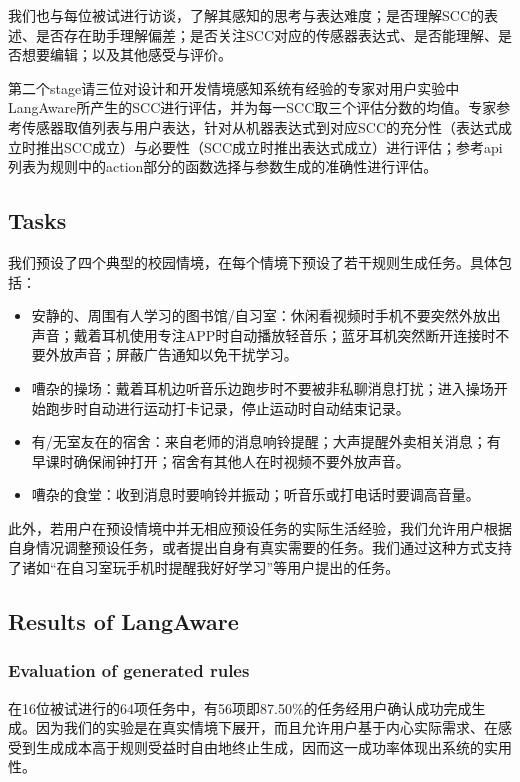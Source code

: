 我们也与每位被试进行访谈，了解其感知的思考与表达难度；是否理解SCC的表述、是否存在助手理解偏差；是否关注SCC对应的传感器表达式、是否能理解、是否想要编辑；以及其他感受与评价。

第二个stage请三位对设计和开发情境感知系统有经验的专家对用户实验中LangAware所产生的SCC进行评估，并为每一SCC取三个评估分数的均值。专家参考传感器取值列表与用户表达，针对从机器表达式到对应SCC的充分性（表达式成立时推出SCC成立）与必要性（SCC成立时推出表达式成立）进行评估；参考api列表为规则中的action部分的函数选择与参数生成的准确性进行评估。


\subsection{Tasks}

我们预设了四个典型的校园情境，在每个情境下预设了若干规则生成任务。具体包括：
\begin{itemize}
    \item 安静的、周围有人学习的图书馆/自习室：休闲看视频时手机不要突然外放出声音；戴着耳机使用专注APP时自动播放轻音乐；蓝牙耳机突然断开连接时不要外放声音；屏蔽广告通知以免干扰学习。
    \item 嘈杂的操场：戴着耳机边听音乐边跑步时不要被非私聊消息打扰；进入操场开始跑步时自动进行运动打卡记录，停止运动时自动结束记录。  
    \item 有/无室友在的宿舍：来自老师的消息响铃提醒；大声提醒外卖相关消息；有早课时确保闹钟打开；宿舍有其他人在时视频不要外放声音。
    \item 嘈杂的食堂：收到消息时要响铃并振动；听音乐或打电话时要调高音量。
\end{itemize}
此外，若用户在预设情境中并无相应预设任务的实际生活经验，我们允许用户根据自身情况调整预设任务，或者提出自身有真实需要的任务。我们通过这种方式支持了诸如“在自习室玩手机时提醒我好好学习”等用户提出的任务。

\subsection{Results of LangAware}

\subsubsection{Evaluation of generated rules}

    在16位被试进行的64项任务中，有56项即87.50\%的任务经用户确认成功完成生成。因为我们的实验是在真实情境下展开，而且允许用户基于内心实际需求、在感受到生成成本高于规则受益时自由地终止生成，因而这一成功率体现出系统的实用性。

